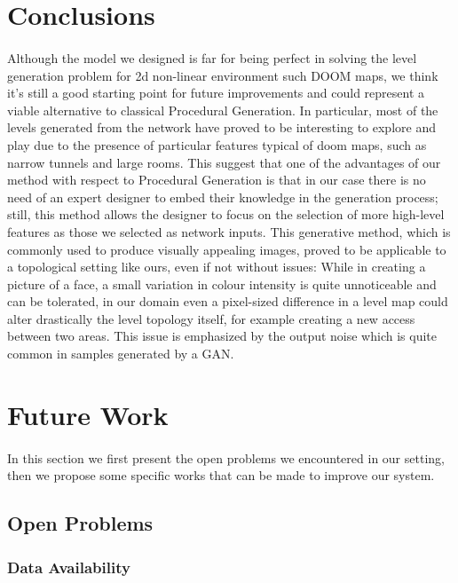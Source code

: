 \section{Conclusions}
\label{sec:conclusions}
\paragraph{} Although the model we designed is far for being perfect in solving the level generation problem for 2d non-linear environment such DOOM maps, we think it's still a good starting point for future improvements and could represent a viable alternative to classical Procedural Generation. In particular, most of the levels generated from the network have proved to be interesting to explore and play due to the presence of particular features typical of doom maps, such as narrow tunnels and large rooms. This suggest that one of the advantages of our method with respect to Procedural Generation is that in our case there is no need of an expert designer to embed their knowledge in the generation process; still, this method allows the designer to focus on the selection of more high-level features as those we selected as network inputs. This generative method, which is commonly used to produce visually appealing images, proved to be applicable to a topological setting like ours, even if not without issues: While in creating a picture of a face, a small variation in colour intensity is quite unnoticeable and can be tolerated, in our domain even a pixel-sized difference in a level map could alter drastically the level topology itself, for example creating a new access between two areas. This issue is emphasized by the output noise which is quite common in samples generated by a GAN.


\section{Future Work}
\label{sec:futurework}
\paragraph{} In this section we first present the open problems we encountered in our setting, then we propose some specific works that can be made to improve our system.
\subsection{Open Problems}
\subsubsection{Data Availability}
